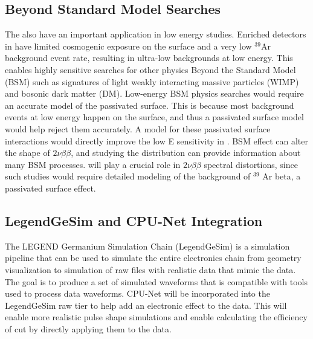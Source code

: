 \subsection{Beyond Standard Model Searches}
The {\ehd} also have an important application in low energy studies. Enriched detectors in {\Lthou} have limited cosmogenic exposure on the surface and a very low $^{39}$Ar background event rate, resulting in ultra-low backgrounds at low energy. This enables highly sensitive searches for other physics Beyond the Standard Model (BSM) such as signatures of light weakly interacting massive particles (WIMP) and bosonic dark matter (DM). Low-energy BSM physics searches would require an accurate model of the passivated surface. This is because most background events at low energy happen on the surface, and thus a passivated surface model would help reject them accurately. A model for these passivated surface interactions would directly improve the low E sensitivity in {\Lthou}. BSM effect can alter the shape of $2\nu\beta\beta$, and studying the distribution can provide information about many BSM processes. {\ehd} will play a crucial role in $2\nu\beta\beta$ spectral distortions, since such studies would require detailed modeling of the background of $^{39}$ Ar beta, a passivated surface effect.

\subsection{LegendGeSim and CPU-Net Integration}
The LEGEND Germanium Simulation Chain (LegendGeSim) is a simulation pipeline that can be used to simulate the entire electronics chain from geometry visualization to simulation of raw files with realistic data that mimic the data. The goal is to produce a set of simulated waveforms that is compatible with tools used to process data waveforms. CPU-Net will be incorporated into the LegendGeSim raw tier to help add an electronic effect to the data. This will enable more realistic pulse shape simulations and enable calculating the efficiency of cut by directly applying them to the data.